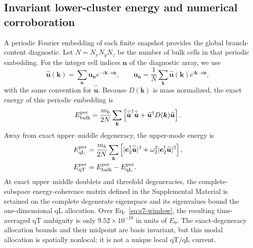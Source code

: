 \documentclass[10pt,aps,pre,reprint,floatfix,notitlepage,nofootinbib]{revtex4-2}
\newcommand{\vk}{\bm{k}}
\newcommand{\qT}{\mathrm{qT}}
\newcommand{\qL}{\mathrm{qL}}
\begin{document}
\subsection{Invariant lower-cluster energy and numerical corroboration}
\label{sec:s7-result}

A periodic Fourier embedding of each finite snapshot provides the global branch-content diagnostic.  Let $N=N_xN_yN_z$ be the number of bulk cells in that periodic embedding. For the integer cell indices $\bm n$ of the diagnostic array, we use
\begin{equation}
 \widehat{\bm u}(\vk)=\sum_{\bm n}\bm u_{\bm n}e^{-i\vk\cdot a\bm n},
 \qquad
 \bm u_{\bm n}=\frac{1}{N}\sum_{\vk}\widehat{\bm u}(\vk)e^{i\vk\cdot a\bm n},
 \label{eq:s7-bulk-dft}
\end{equation}
with the same convention for $\widehat{\dot{\bm u}}$. Because $D(\vk)$ is mass normalized, the exact energy of this periodic embedding is
\begin{equation}
 E_{\rm bulk}^{\rm per}
 =\frac{m_b}{2N}\sum_{\vk}
 \left[
  \widehat{\dot{\bm u}}^{\dagger}\widehat{\dot{\bm u}}
  +\widehat{\bm u}^{\dagger}D(\vk)\widehat{\bm u}
 \right].
 \label{eq:s7-periodic-total-energy}
\end{equation}
Away from exact upper--middle degeneracy, the upper-mode energy is~\cite{BornHuang1954}
\begin{align}
 E_{\qL}^{\rm per}
 &=\frac{m_b}{2N}\sum_{\bm k}
 \left[
 |\bm e_2^\dagger\widehat{\dot{\bm u}}|^2
 +\omega_2^2|\bm e_2^\dagger\widehat{\bm u}|^2
 \right],\\
 E_{\qT}^{\rm per}
 &=E_{\rm bulk}^{\rm per}-E_{\qL}^{\rm per}.
 \label{eq:s7-modal-energy}
\end{align}
At exact upper--middle doublets and threefold degeneracies, the complete-subspace energy-coherence matrix defined in the Supplemental Material is retained on the complete degenerate eigenspace and its eigenvalues bound the one-dimensional $\qL$ allocation.  Over Eq.~\eqref{eq:s7-window}, the resulting time-averaged $\qT$ ambiguity is only $9.52\times10^{-10}$ in units of $E_0$.  The exact-degeneracy allocation bounds and their midpoint are basis invariant, but this modal allocation is spatially nonlocal; it is not a unique local $\qT/\qL$ current.
\end{document}
